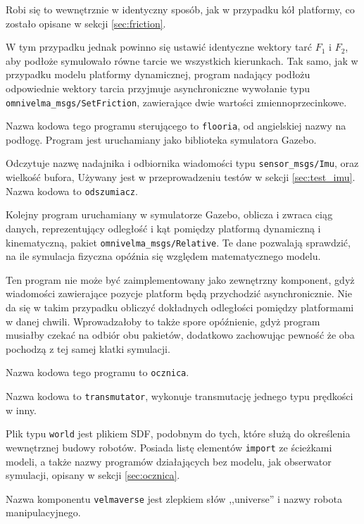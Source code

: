 	Robi się to wewnętrznie w identyczny sposób, jak w przypadku kół platformy, co zostało opisane w sekcji \ref{sec:friction}.
	
	W tym przypadku jednak powinno się ustawić identyczne wektory tarć $F_1$ i $F_2$, aby podłoże symulowało równe tarcie we wszystkich kierunkach.
	Tak samo, jak w przypadku modelu platformy dynamicznej, program nadający podłożu odpowiednie wektory tarcia przyjmuje asynchroniczne wywołanie 
	typu \texttt{omnivelma\_msgs/SetFriction}, zawierające dwie wartości zmiennoprzecinkowe.
	
	Nazwa kodowa tego programu sterującego to \texttt{flooria}, od angielskiej nazwy na podłogę.
	Program jest uruchamiany jako biblioteka symulatora Gazebo.
	
	Odczytuje nazwę nadajnika i odbiornika wiadomości typu \texttt{sensor\_msgs/Imu}, oraz wielkość bufora,
	Używany jest w przeprowadzeniu testów w sekcji \ref{sec:test_imu}. Nazwa kodowa to \texttt{odszumiacz}.
	
	Kolejny program uruchamiany w symulatorze Gazebo, oblicza i zwraca ciąg danych, reprezentujący 
	odległość i kąt pomiędzy platformą dynamiczną i kinematyczną, pakiet \texttt{omnivelma\_msgs/Relative}.
	Te dane pozwalają sprawdzić, na ile symulacja fizyczna opóźnia się względem matematycznego modelu.
	
	Ten program nie może być zaimplementowany jako zewnętrzny komponent, gdyż wiadomości zawierające pozycje platform będą przychodzić asynchronicznie.
	Nie da się w takim przypadku obliczyć dokładnych odległości pomiędzy platformami w danej chwili. 
	Wprowadzałoby to także spore opóźnienie, gdyż program musiałby czekać na odbiór obu pakietów, dodatkowo zachowując pewność że oba pochodzą z tej samej klatki symulacji.
	
	Nazwa kodowa tego programu to \texttt{ocznica}.
	
	Nazwa kodowa to \texttt{transmutator}, wykonuje transmutację jednego typu prędkości w inny.
	
	Plik typu \texttt{world} jest plikiem SDF, podobnym do tych, które służą do określenia wewnętrznej budowy robotów.
	Posiada listę elementów \texttt{import} ze ścieżkami modeli, a także nazwy programów działających bez modelu, jak obserwator symulacji, opisany w sekcji \ref{sec:ocznica}.

	Nazwa komponentu \texttt{velmaverse} jest zlepkiem słów ,,universe'' i nazwy robota manipulacyjnego.
	
